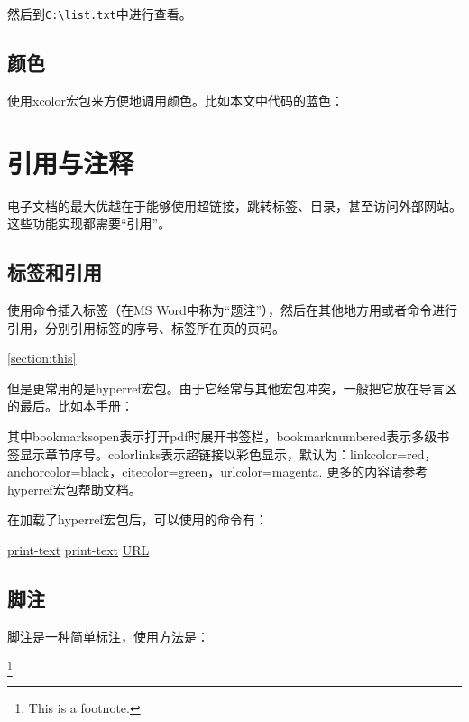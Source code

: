 {然后到\verb|C:\list.txt|中进行查看。

\subsection{颜色}
使用xcolor宏包来方便地调用颜色。比如本文中代码的蓝色：
\begin{latex}{}
\usepackage{xcolor}
{\color{color-name}{text}}
\end{latex}

\section{引用与注释}
电子文档的最大优越在于能够使用超链接，跳转标签、目录，甚至访问外部网站。这些功能实现都需要“引用”。
\subsection{标签和引用}
使用\latexline{\\label}命令插入标签（在MS Word中称为“题注”），然后在其他地方用\latexline{\\ref}或者\latexline{\\pageref}命令进行引用，分别引用标签的序号、标签所在页的页码。
\begin{latex}{}
\label{section:this}
\ref{section:this}
\pageref{section:this}
\end{latex}

但是更常用的是hyperref宏包。由于它经常与其他宏包冲突，一般把它放在导言区的最后。比如本手册：
\begin{latex}{}
\usepackage[colorlinks,bookmarksopen=true,
bookmarksnumbered=true]{hyperref}
\end{latex}

其中bookmarksopen表示打开pdf时展开书签栏，bookmarknumbered表示多级书签显示章节序号。colorlinks表示超链接以彩色显示，默认为：linkcolor=red，anchorcolor=black，citecolor=green，urlcolor=magenta. 更多的内容请参考hyperref宏包帮助文档。

在加载了hyperref宏包后，可以使用的命令有：
\begin{latex}{}
\hyperref[label-name]{print-text}
\href{URL}{print-text}
\url{URL}
\end{latex}

\subsection{脚注}
脚注是一种简单标注，使用方法是：
\begin{latex}{}
\footnote{This is a footnote.}
\end{latex}

}
